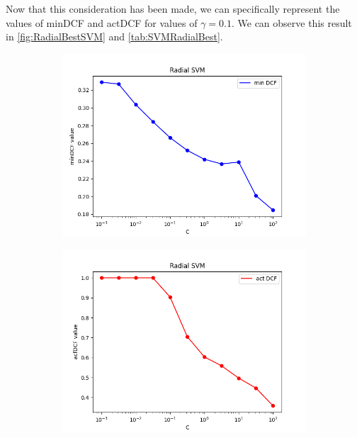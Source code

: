 Now that this consideration has been made, we can specifically represent the values of minDCF and actDCF for values of \(\gamma=0.1\).
We can observe this result in \autoref{fig:RadialBestSVM} and \autoref{tab:SVMRadialBest}.

\begin{figure}[h!]
    \centering
    \begin{subfigure}[b]{0.30\linewidth}
        \includegraphics[width=\linewidth]{Lab/09. Lab 09/Images/09. Radial Best - minDCF}
        \label{fig:RadialBestminDCF}
    \end{subfigure}
    \begin{subfigure}[b]{0.30\linewidth}
        \includegraphics[width=\linewidth]{Lab/09. Lab 09/Images/10. Radial Best - actDCF}

\end{subfigure}
\end{figure}
